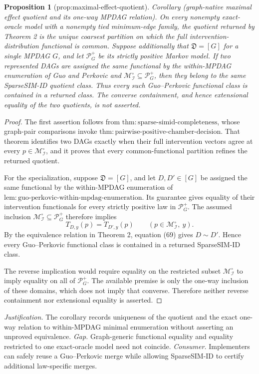 \documentclass{article}
\newtheorem{proposition}{Proposition}
\begin{document}
\begin{proposition}[prop:maximal-effect-quotient]\label{prop:maximal-effect-quotient}
Corollary (graph-native maximal effect quotient and its one-way MPDAG relation).  On every nonempty exact-oracle model with a nonempty tied minimum-edge family, the quotient returned by Theorem 2 is the unique coarsest partition on which the full intervention-distribution functional is common.  Suppose additionally that \(\mathfrak D=[G]\) for a single MPDAG \(G\), and let \(\mathcal P_G^+\) be its strictly positive Markov model.  If two represented DAGs are assigned the same functional by the within-MPDAG enumeration of Guo and Perkovic and \(\mathcal M_{\mathcal I}^{\circ}\subseteq\mathcal P_G^+\), then they belong to the same SparseSIM-ID quotient class.  Thus every such Guo--Perkovic functional class is contained in a returned class.  The converse containment, and hence extensional equality of the two quotients, is not asserted.
\end{proposition}
\begin{proof}
The first assertion follows from \(\mathrm{thm{:}sparse\text{-}simid\text{-}completeness}\), whose graph-pair comparisons invoke \(\mathrm{thm{:}pairwise\text{-}positive\text{-}chamber\text{-}decision}\).  That theorem identifies two DAGs exactly when their full intervention vectors agree at every \(p\in\mathcal M_{\mathcal I}^{\circ}\), and it proves that every common-functional partition refines the returned quotient.

For the specialization, suppose \(\mathfrak D=[G]\), and let \(D,D'\in[G]\) be assigned the same functional by the within-MPDAG enumeration of \(\mathrm{lem{:}guo\text{-}perkovic\text{-}within\text{-}mpdag\text{-}enumeration}\).  Its guarantee gives equality of their intervention functionals for every strictly positive law in \(\mathcal P_G^+\).  The assumed inclusion \(\mathcal M_{\mathcal I}^{\circ}\subseteq\mathcal P_G^+\) therefore implies
\[
 T_{D,y}(p)=T_{D',y}(p)
 \qquad
 (p\in\mathcal M_{\mathcal I}^{\circ},\ y). \tag{69}
\]
By the equivalence relation in Theorem 2, equation (69) gives \(D\sim D'\).  Hence every Guo--Perkovic functional class is contained in a returned SparseSIM-ID class.

The reverse implication would require equality on the restricted subset \(\mathcal M_{\mathcal I}^{\circ}\) to imply equality on all of \(\mathcal P_G^+\).  The available premise is only the one-way inclusion of these domains, which does not imply that converse.  Therefore neither reverse containment nor extensional equality is asserted.
\end{proof}
\par\smallskip\noindent \textit{Justification.} The corollary records uniqueness of the quotient and the exact one-way relation to within-MPDAG minimal enumeration without asserting an unproved equivalence. \textit{Gap.} Graph-generic functional equality and equality restricted to one exact-oracle model need not coincide. \textit{Consumer.} Implementers can safely reuse a Guo--Perkovic merge while allowing SparseSIM-ID to certify additional law-specific merges.
\end{document}
